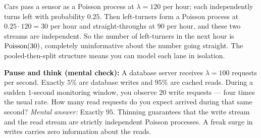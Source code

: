 \begin{example}
\label{ch25:ex-thinning}
Cars pass a sensor as a Poisson process at $\lambda = 120$ per hour; each
independently turns left with probability $0.25$. Then left-turners form a
Poisson process at $0.25 \cdot 120 = 30$ per hour and straight-throughs at $90$
per hour, and these two streams are independent. So the number of left-turners in
the next hour is $\operatorname{Poisson}(30)$, completely uninformative about the number going
straight. The pooled-then-split structure means you can model each lane in
isolation.
\end{example}

\begin{walkbox}
\textbf{Pause and think (mental check):} A database server receives $\lambda = 100$
requests per second. Exactly $5\%$ are database writes and $95\%$ are cached reads.
During a sudden $1$-second monitoring window, you observe $20$ write requests --- four
times the usual rate. How many read requests do you expect arrived during that same second?
\emph{Mental answer:} Exactly $95$. Thinning guarantees that the write stream and the
read stream are strictly independent Poisson processes. A freak surge in writes carries
zero information about the reads.
\end{walkbox}

